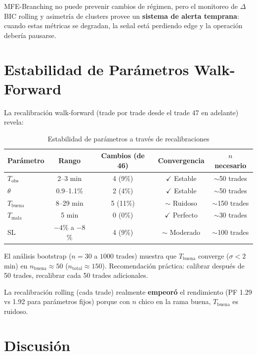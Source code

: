 \documentclass[11pt,a4paper]{article}
\begin{document}
MFE-Branching no puede prevenir cambios de régimen, pero el monitoreo de $\Delta$BIC rolling y asimetría de clusters provee un \textbf{sistema de alerta temprana}: cuando estas métricas se degradan, la señal está perdiendo edge y la operación debería pausarse.

\section{Estabilidad de Parámetros Walk-Forward}

La recalibración walk-forward (trade por trade desde el trade 47 en adelante) revela:

\begin{table}[H]
\centering
\caption{Estabilidad de parámetros a través de recalibraciones}
\begin{tabular}{lcccc}
\toprule
Parámetro & Rango & Cambios (de 46) & Convergencia & $n$ necesario \\
\midrule
$T_{\text{obs}}$ & 2--3 min & 4 (9\%) & $\checkmark$ Estable & $\sim$50 trades \\
$\theta$ & 0.9--1.1\% & 2 (4\%) & $\checkmark$ Estable & $\sim$50 trades \\
$T_{\text{buena}}$ & 8--29 min & 5 (11\%) & $\sim$ Ruidoso & $\sim$150 trades \\
$T_{\text{mala}}$ & 5 min & 0 (0\%) & $\checkmark$ Perfecto & $\sim$30 trades \\
SL & $-4$\% a $-8$\% & 4 (9\%) & $\sim$ Moderado & $\sim$100 trades \\
\bottomrule
\end{tabular}
\end{table}

El análisis bootstrap ($n = 30$ a $1000$ trades) muestra que $T_{\text{buena}}$ converge ($\sigma < 2$ min) en $n_{\text{buena}} \approx 50$ ($n_{\text{total}} \approx 150$). Recomendación práctica: calibrar después de 50 trades, recalibrar cada 50 trades adicionales.

La recalibración rolling (cada trade) realmente \textbf{empeoró} el rendimiento (PF 1.29 vs 1.92 para parámetros fijos) porque con $n$ chico en la rama buena, $T_{\text{buena}}$ es ruidoso.

\section{Discusión}
\end{document}
